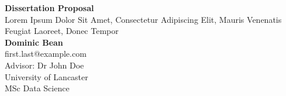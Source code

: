 \documentclass{article}
\begin{document}

	\begin{center}
	
        \LARGE{\textbf{Dissertation Proposal}} \\
        \vspace{1em}
        \Large{Lorem Ipsum Dolor Sit Amet, Consectetur Adipiscing Elit, Mauris Venenatis Feugiat Laoreet, Donec Tempor} \\
        \vspace{1em}
        \normalsize\textbf{Dominic Bean} \\
        \normalsize{first.last@example.com} \\
        \vspace{1em}
        \normalsize{Advisor: Dr John Doe} \\
        \vspace{1em}
        \normalsize{University of Lancaster} \\
        \normalsize{MSc Data Science}
     
	\end{center}
	
    
    \begin{normalsize}
    
        
        
        
        
        
        
        
    \end{normalsize}

    
    
    
  
\end{document}
